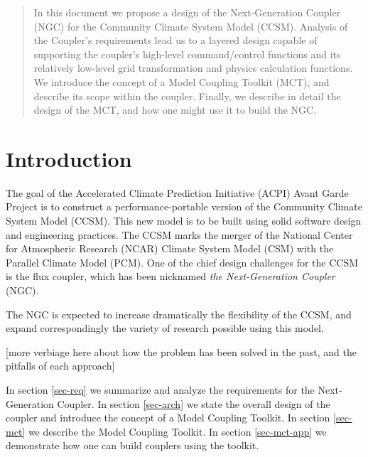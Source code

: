 \documentclass{article}
\begin{document}
\vspace*{\fill}


\newpage
\setcounter{page}{3}     %

\vspace*{\fill}

\begin{abstract}
In this document we propose a design of the Next-Generation
Coupler (NGC) for the Community Climate System Model (CCSM).
Analysis of the Coupler's requirements lead us to a layered
design capable of supporting the coupler's high-level
command/control functions and its relatively low-level grid
transformation and physics calculation functions.  We introduce
the concept of a Model Coupling Toolkit (MCT), and describe its
scope within the coupler.  Finally, we describe in detail the
design of the MCT, and how one might use it to build the NGC.
\end{abstract}

\vspace*{\fill}
\newpage

\tableofcontents
\newpage



\section{Introduction}

The goal of the Accelerated Climate Prediction Initiative (ACPI)
Avant Garde Project is to construct a performance-portable
version of the Community Climate System Model (CCSM).  This new
model is to be built using solid software design and engineering
practices.  The CCSM marks the merger of the National Center for
Atmospheric Research (NCAR) Climate System Model (CSM) with the
Parallel Climate Model (PCM).   One of the chief design
challenges for the CCSM is the flux coupler, which has been
nicknamed {\em the Next-Generation Coupler} (NGC).

The NGC is expected to increase dramatically the flexibility of
the CCSM, and expand correspondingly the variety of research
possible using this model.

[more verbiage here about how the problem has been solved in the
past, and the pitfalls of each approach]

In section \ref{sec-req} we summarize and analyze the requirements
for the Next-Generation Coupler.  In section \ref{sec-arch} we
state the overall design of the coupler and introduce the concept
of a Model Coupling Toolkit.  In section \ref{sec-mct} we
describe the Model Coupling Toolkit.  In section
\ref{sec-mct-app} we demonstrate how one can build couplers using
the toolkit.
\end{document}
